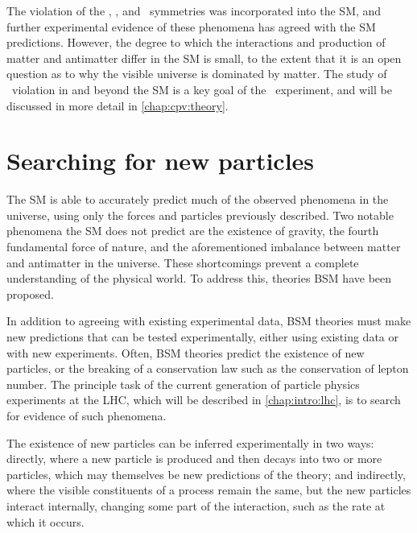 The violation of the \Ctransform, \Ptransform, and \CP\ symmetries was 
incorporated into the \ac{SM}, and further experimental evidence of these 
phenomena has agreed with the \ac{SM} predictions.
However, the degree to which the interactions and production of matter and 
antimatter differ in the \ac{SM} is small, to the extent that it is an open 
question as to why the visible universe is dominated by matter.
The study of \CP\ violation in and beyond the \ac{SM} is a key goal of the 
\lhcb\ experiment, and will be discussed in more detail in 
\cref{chap:cpv:theory}.

\section{Searching for new particles}

The \acl{SM} is able to accurately predict much of the observed phenomena in 
the universe, using only the forces and particles previously described.
Two notable phenomena the \ac{SM} does not predict are the existence of 
gravity, the fourth fundamental force of nature, and the aforementioned 
imbalance between matter and antimatter in the universe.
These shortcomings prevent a complete understanding of the physical world.
To address this, theories \acf{BSM} have been proposed.


In addition to agreeing with existing experimental data, \ac{BSM} theories must 
make new predictions that can be tested experimentally, either using existing 
data or with new experiments.
Often, \ac{BSM} theories predict the existence of new particles, or the 
breaking of a conservation law such as the conservation of lepton number.
The principle task of the current generation of particle physics experiments at 
the \acl{LHC}, which will be described in \cref{chap:intro:lhc}, is to search 
for evidence of such phenomena.

The existence of new particles can be inferred experimentally in two ways: 
directly, where a new particle is produced and then decays into two or more 
particles, which may themselves be new predictions of the theory; and 
indirectly, where the visible constituents of a process remain the same, but 
the new particles interact internally, changing some part of the interaction, 
such as the rate at which it occurs.

